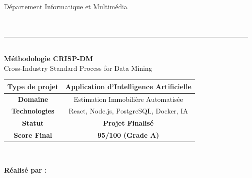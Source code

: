 
\begin{titlepage}
    \centering
    
    \vspace*{1cm}
    {\Large \textbf{\etablissement}}\\[0.5cm]
    {\large Département Informatique et Multimédia}\\[2cm]
    
    {\Huge \textcolor{housyblue}{\textbf{\projetnom}}}\\[0.8cm]
    {\Large \textcolor{housygray}{\projetsubtitle}}\\[2cm]
    
    \rule{\linewidth}{0.5mm}\\[0.5cm]
    
    {\large \textbf{Méthodologie CRISP-DM}}\\
    {\large Cross-Industry Standard Process for Data Mining}\\[2cm]
    
    \begin{minipage}{0.8\textwidth}
        \centering
        \begin{tabular}{|c|c|}
            \hline
            \textbf{Type de projet} & Application d'Intelligence Artificielle \\
            \hline
            \textbf{Domaine} & Estimation Immobilière Automatisée \\
            \hline
            \textbf{Technologies} & React, Node.js, PostgreSQL, Docker, IA \\
            \hline
            \textbf{Statut} & \textcolor{housygreen}{\textbf{Projet Finalisé}} \\
            \hline
            \textbf{Score Final} & \textcolor{housygreen}{\textbf{95/100 (Grade A)}} \\
            \hline
        \end{tabular}
    \end{minipage}\\[2cm]
    
    \begin{minipage}{0.45\textwidth}
        \begin{flushleft}
            \textbf{Réalisé par :}\\
            \auteur\\[1cm]
            

\end{flushleft}
\end{minipage}
\end{titlepage}
